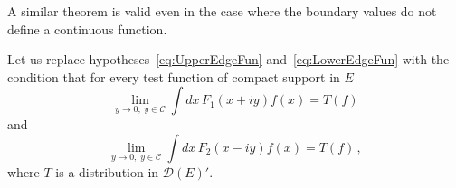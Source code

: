 A similar theorem is valid even in the case where the boundary 
values do not define a continuous function. 

\begin{Thm}
    \label{thm:EdgeWedgeDistr}
    Let us replace hypotheses~\eqref{eq:UpperEdgeFun} 
    and~\eqref{eq:LowerEdgeFun} with the condition that for every 
    test function of compact support in $E$
    \begin{equation}
        \label{eq:UpperEdgeDistr}
        \lim_{y\to 0,\; y\in \mathcal{C}} 
        \int dx\, F_1(x+iy) f(x) = T(f)
    \end{equation}
    and 
    \begin{equation}
        \label{eq:LowerEdgeDistr}
        \lim_{y\to 0,\; y\in \mathcal{C}} 
        \int dx\, F_2(x-iy) f(x) = T(f)\, ,
    \end{equation}
    where $T$ is a distribution in $\mathcal{D}(E)'$.
\end{Thm}
